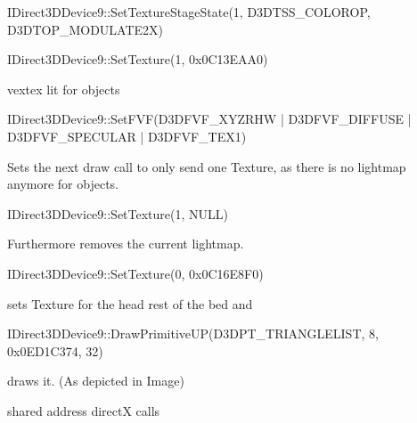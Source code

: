 IDirect3DDevice9::SetTextureStageState(1, D3DTSS_COLOROP, D3DTOP_MODULATE2X)



IDirect3DDevice9::SetTexture(1, 0x0C13EAA0)		

 




vextex lit for objects

IDirect3DDevice9::SetFVF(D3DFVF_XYZRHW | D3DFVF_DIFFUSE | D3DFVF_SPECULAR | D3DFVF_TEX1)

Sets the next draw call to only send one Texture, as there is no lightmap anymore for objects.					

IDirect3DDevice9::SetTexture(1, NULL) 
					
Furthermore removes the current lightmap.

IDirect3DDevice9::SetTexture(0, 0x0C16E8F0)

sets Texture for the head rest of the bed and 
		
IDirect3DDevice9::DrawPrimitiveUP(D3DPT_TRIANGLELIST, 8, 0x0ED1C374, 32)

draws it. (As depicted in Image)







	shared address
	directX calls
\fi

\clearpage
\printbibliography[heading=bibintoc]

\appendix

